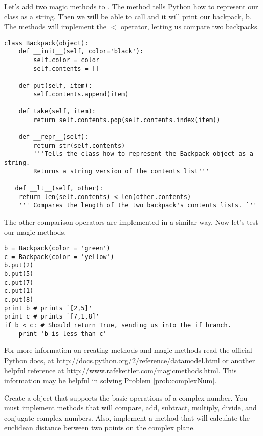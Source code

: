 Let's add two magic methods to . 
The  method tells Python how to represent our class as a string. 
Then we will be able to call  and it will print our backpack, b.
The  methods will implement the $<$ operator, letting us compare two backpacks.

\begin{lstlisting}
class Backpack(object):
    def __init__(self, color='black'):
        self.color = color
        self.contents = []
        
    def put(self, item):
        self.contents.append(item)
        
    def take(self, item):
        return self.contents.pop(self.contents.index(item)) 
        
    def __repr__(self):
        return str(self.contents)
        '''Tells the class how to represent the Backpack object as a string.
        Returns a string version of the contents list'''
        
   def __lt__(self, other):
   	return len(self.contents) < len(other.contents)
   	''' Compares the length of the two backpack's contents lists. `''
\end{lstlisting}

The other comparison operators are implemented in a similar way.
Now let's test our magic methods.

\begin{lstlisting}
b = Backpack(color = 'green')
c = Backpack(color = 'yellow')
b.put(2)
b.put(5)
c.put(7)
c.put(1)
c.put(8)
print b # prints `[2,5]'
print c # prints `[7,1,8]'
if b < c: # Should return True, sending us into the if branch.
	print 'b is less than c'

\end{lstlisting}

For more information on creating methods and magic methods read the official Python docs, at \url {http://docs.python.org/2/reference/datamodel.html} or another helpful reference at \url{http://www.rafekettler.com/magicmethods.html}.
This information may be helpful in solving Problem \ref{prob:complexNum}.

\begin{problem}
Create a  object that supports the basic operations of a complex number.
You must implement methods that will compare, add, subtract, multiply, divide, and conjugate complex numbers.
Also, implement a  method that will calculate the euclidean distance between two points on the complex plane.
\label{prob:complexNum}
\end{problem}

